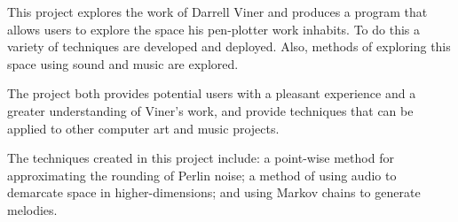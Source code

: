 This project explores the work of Darrell Viner and produces a program that
allows users to explore the space his pen-plotter work inhabits. To do this a
variety of techniques are developed and deployed. Also, methods of exploring
this space using sound and music are explored. 

The project both provides potential users with a pleasant experience and a
greater understanding of Viner's work, and provide techniques that can be
applied to other computer art and music projects.

The techniques created in this project include: a point-wise method for
approximating the rounding of Perlin noise; a method of using audio to demarcate
space in higher-dimensions; and using Markov chains to generate melodies.
